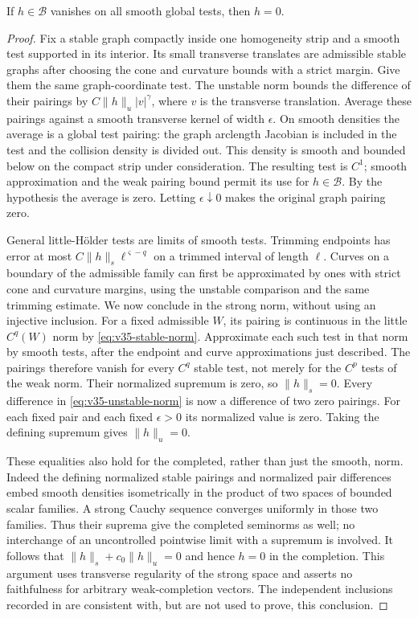 \begin{lemma}
\label{lem:v35-faithful-strong}
If $h\in\mathcal B$ vanishes on all smooth global tests, then $h=0$.
\end{lemma}
\begin{proof}
Fix a stable graph compactly inside one homogeneity strip and a smooth
test supported in its interior. Its small transverse translates are
admissible stable graphs after choosing the cone and curvature bounds
with a strict margin. Give them the same graph-coordinate test. The
unstable norm bounds the difference of their pairings by
$C\|h\|_u|v|^\gamma$, where $v$ is the transverse translation.
Average these pairings against a smooth transverse kernel of width
$\epsilon$. On smooth densities the average is a global test pairing:
the graph arclength Jacobian is included in the test and the collision
density is divided out. This density is smooth and bounded below on
the compact strip under consideration. The resulting test is $C^1$;
smooth approximation and the weak pairing bound permit its use for
$h\in\mathcal B$. By the hypothesis the average is zero. Letting
$\epsilon\downarrow0$ makes the original graph pairing zero.

General little-H\"older tests are limits of smooth tests. Trimming
endpoints has error at most $C\|h\|_s\ell^{\varsigma-q}$ on a trimmed
interval of length $\ell$. Curves on a boundary of the admissible
family can first be approximated by ones with strict cone and curvature
margins, using the unstable comparison and the same trimming estimate.
We now conclude in the strong norm, without using an injective inclusion.
For a fixed admissible $W$, its pairing is continuous in the little
$C^q(W)$ norm by \eqref{eq:v35-stable-norm}. Approximate each such test
in that norm by smooth tests, after the endpoint and curve
approximations just described. The pairings therefore vanish for every
$C^q$ stable test, not merely for the $C^p$ tests of the weak norm.
Their normalized supremum is zero, so $\|h\|_s=0$.
Every difference in \eqref{eq:v35-unstable-norm} is now a difference
of two zero pairings. For each fixed pair and each fixed $\epsilon>0$
its normalized value is zero. Taking the defining supremum gives
$\|h\|_u=0$.

These equalities also hold for the completed, rather than just the
smooth, norm. Indeed the defining normalized stable pairings and
normalized pair differences embed smooth densities isometrically in
the product of two spaces of bounded scalar families. A strong Cauchy
sequence converges uniformly in those two families. Thus their
suprema give the completed seminorms as well; no interchange of an
uncontrolled pointwise limit with a supremum is involved. It follows
that $\|h\|_s+c_0\|h\|_u=0$ and hence $h=0$ in the completion.
This argument uses transverse regularity of the strong space and
asserts no faithfulness for arbitrary weak-completion vectors.
The independent inclusions recorded in \cite[Lemma 3.2(c), footnote 7]{DPZ}
are consistent with, but are not used to prove, this conclusion.
\end{proof}


